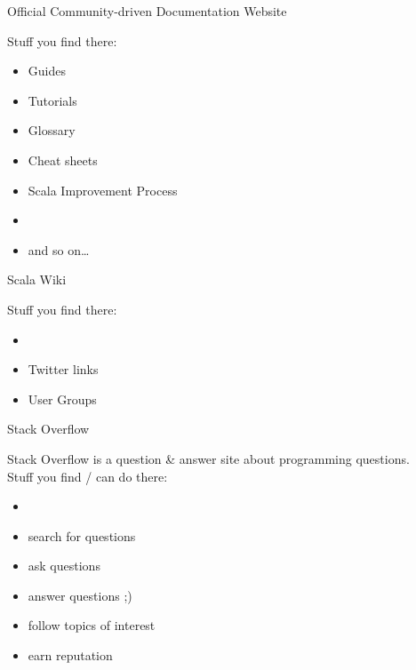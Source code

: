 \begin{frame}{Official Community-driven Documentation Website}
\begin{center}
\end{center}
Stuff you find there:
\begin{itemize}
  \item Guides
  \item Tutorials
  \item Glossary
  \item Cheat sheets
  \item Scala Improvement Process
  \item {}
  \item and so on\ldots
\end{itemize}
\end{frame}

\begin{frame}{Scala Wiki}
\begin{center}
\end{center}
Stuff you find there:
\begin{itemize}
  \item {}
  \item Twitter links
  \item User Groups
\end{itemize}
\end{frame}

\begin{frame}{Stack Overflow}
\begin{center}
\end{center}
Stack Overflow is a question \& answer site about programming questions.\\
Stuff you find / can do there:
\begin{itemize}
  \item {}
  \item search for questions
  \item ask questions
  \item answer questions ;)
  \item follow topics of interest
  \item earn reputation
\end{itemize}
\end{frame}

